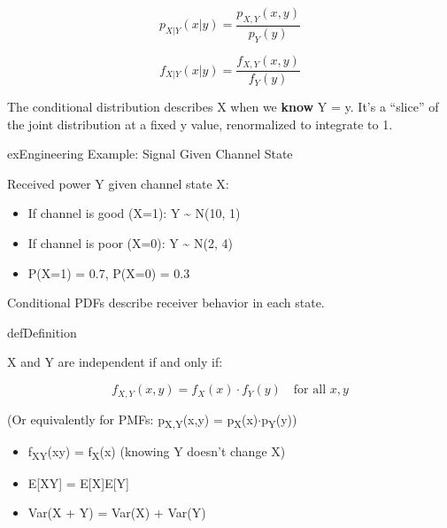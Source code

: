 

\[p_{X|Y}(x|y) = \frac{p_{X,Y}(x,y)}{p_Y(y)}\]


\[f_{X|Y}(x|y) = \frac{f_{X,Y}(x,y)}{f_Y(y)}\]


The conditional distribution describes X when we \textbf{know} Y = y. It’s a ``slice'' of the joint distribution at a fixed y value, renormalized to integrate to 1.

\begin{PSbox}[unbreakable]{ex}{Engineering Example: Signal Given Channel State}

Received power Y given channel state X:

\begin{itemize}
\tightlist
\item
  If channel is good (X=1): Y \textasciitilde{} N(10, 1)
\item
  If channel is poor (X=0): Y \textasciitilde{} N(2, 4)
\item
  P(X=1) = 0.7, P(X=0) = 0.3
\end{itemize}

Conditional PDFs describe receiver behavior in each state.

\end{PSbox}


\begin{PSbox}[unbreakable]{def}{Definition}

X and Y are independent if and only if:

\[f_{X,Y}(x,y) = f_X(x) \cdot f_Y(y) \quad \text{for all } x, y\]

(Or equivalently for PMFs: p\textsubscript{X,Y}(x,y) = p\textsubscript{X}(x)\ensuremath{\cdot}p\textsubscript{Y}(y))

\end{PSbox}


\begin{itemize}
\tightlist
\item
  f\textsubscript{X\textbar{}Y}(x\textbar{}y) = f\textsubscript{X}(x) (knowing Y doesn’t change X)
\item
  E[XY] = E[X]E[Y]
\item
  Var(X + Y) = Var(X) + Var(Y)
\end{itemize}

